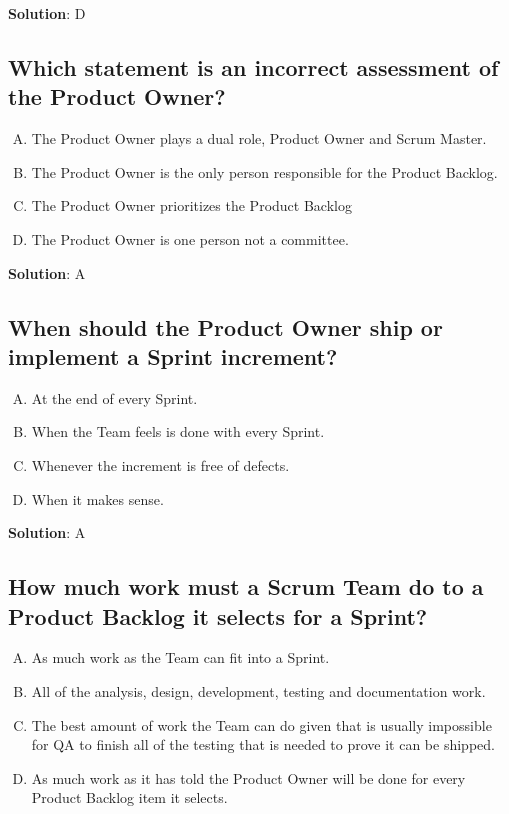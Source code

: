 \textbf{Solution}: D


\subsection{Which statement is an incorrect assessment of the Product Owner?}
\begin{enumerate}[A)]
  \item The Product Owner plays a dual role, Product Owner and Scrum Master.
  \item The Product Owner is the only person responsible for the Product Backlog.
  \item The Product Owner prioritizes the Product Backlog
  \item The Product Owner is one person not a committee.
\end{enumerate}


\textbf{Solution}: A


\subsection{When should the Product Owner ship or implement a Sprint increment?}
\begin{enumerate}[A)]
  \item At the end of every Sprint.
  \item When the Team feels is done with every Sprint.
  \item Whenever the increment is free of defects.
  \item When it makes sense.
\end{enumerate}


\textbf{Solution}: A


\subsection{How much work must a Scrum Team do to a Product Backlog it selects for a Sprint?}
\begin{enumerate}[A)]
  \item As much work as the Team can fit into a Sprint.
  \item All of the analysis, design, development, testing and documentation work.
  \item The best amount of work the Team can do given that is usually impossible for QA to finish all of the testing that is needed to prove it can be shipped.
  \item As much work as it has told the Product Owner will be done for every Product Backlog item it selects.
\end{enumerate}



